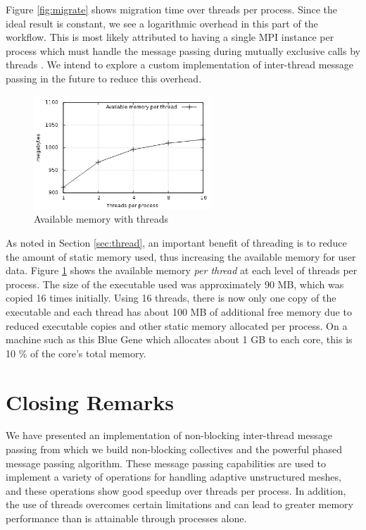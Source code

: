 \documentclass[final,1p,times]{elsarticle}
\begin{document}
Figure \ref{fig:migrate} shows migration time over threads per process.
Since the ideal result is constant, we see a logarithmic overhead
in this part of the workflow.
This is most likely attributed to having a single MPI instance per process
which must handle the message passing during mutually exclusive calls
by threads \cite{mavriplis2002parallel}.
We intend to explore a custom implementation of inter-thread message passing
in the future to reduce this overhead.

\begin{figure}[!ht]
\begin{center}
\caption{Available memory with threads}
\label{fig:memory}
\includegraphics[width=0.6\textwidth]{memory.png}
\end{center}
\end{figure}

As noted in Section \ref{sec:thread}, an important benefit
of threading is to reduce the amount of static memory used, thus increasing
the available memory for user data.
Figure \ref{fig:memory} shows the available memory \emph{per thread} at
each level of threads per process.
The size of the executable used was approximately 90 MB, which was copied
16 times initially.
Using 16 threads, there is now only one copy of the executable and each thread
has about 100 MB of additional free memory due to reduced executable copies
and other static memory allocated per process.
On a machine such as this Blue Gene which allocates about 1 GB to each core,
this is 10 \% of the core's total memory.

\section{Closing Remarks}
\label{sec:conclusion}

We have presented an implementation of non-blocking inter-thread message passing
from which we build non-blocking collectives and the powerful phased
message passing algorithm.
These message passing capabilities are used to implement a variety of
operations for handling adaptive unstructured meshes, and
these operations show good speedup over threads per process.
In addition, the use of threads overcomes certain 
limitations and can lead to greater memory performance than is
attainable through processes alone.
\end{document}
